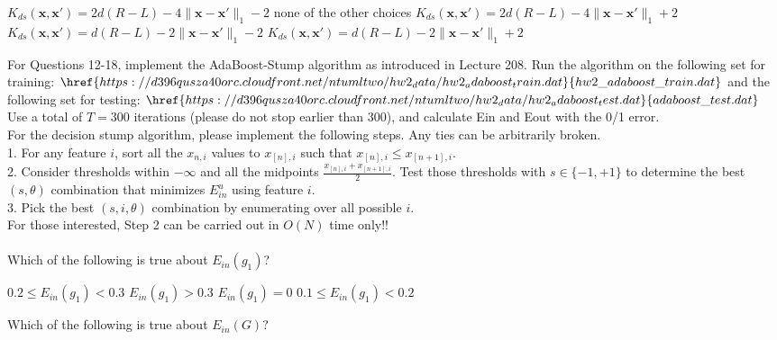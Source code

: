 \documentclass[a4paper,10pt]{exam}
\begin{document}
\begin{questions}
\begin{checkboxes}
	\choice $K_{ds}(\mathbf{x}, \mathbf{x}') = 2d(R-L) - 4\|\mathbf{x}-\mathbf{x}'\|_1 - 2$
	\choice none of the other choices
	\CorrectChoice $K_{ds}(\mathbf{x}, \mathbf{x}') = 2d(R-L) - 4\|\mathbf{x}-\mathbf{x}'\|_1 + 2$
	\choice $K_{ds}(\mathbf{x}, \mathbf{x}') = d(R-L) - 2\|\mathbf{x}-\mathbf{x}'\|_1 - 2$
	\choice $K_{ds}(\mathbf{x}, \mathbf{x}') = d(R-L) - 2\|\mathbf{x}-\mathbf{x}'\|_1 + 2$\\
\end{checkboxes}

\question For Questions 12-18, implement the AdaBoost-Stump algorithm as introduced in Lecture 208. Run the algorithm on the following set for training: $\href{https://d396qusza40orc.cloudfront.net/ntumltwo/hw2_data/hw2_adaboost_train.dat}{hw2\_adaboost\_train.dat}$ and the following set for testing: $\href{https://d396qusza40orc.cloudfront.net/ntumltwo/hw2_data/hw2_adaboost_test.dat}{adaboost\_test.dat}$\\
Use a total of $T=300$ iterations (please do not stop earlier than 300), and calculate Ein and Eout with the 0/1 error.\\
For the decision stump algorithm, please implement the following steps. Any ties can be arbitrarily broken. \\
1. For any feature $i$, sort all the $x_{n, i}$ values to $x_{[n], i}$ such that $x_{[n], i} \le x_{[n+1], i}$. \\
2. Consider thresholds within $-\infty$ and all the midpoints $\frac{x_{[n], i} + x_{[n+1], i}}{2}$. Test those thresholds with $s \in \{-1, +1\}$ to determine the best $(s,\theta)$ combination that minimizes $E_{in}^u$ using feature $i$. \\
3. Pick the best $(s,i,θ)$ combination by enumerating over all possible $i$.\\
For those interested, Step 2 can be carried out in $O(N)$ time only!!\\ \\
Which of the following is true about $E_{in}(g_1)$?

\begin{checkboxes} 
    \CorrectChoice $0.2 \le E_{in}(g_1) < 0.3$
	\choice $E_{in}(g_1) > 0.3$
	\choice $E_{in}(g_1) = 0$
	\choice $0.1 \le E_{in}(g_1) < 0.2$\\
\end{checkboxes}

\question Which of the following is true about $E_{in}(G)$?


\end{questions}
\end{document}
